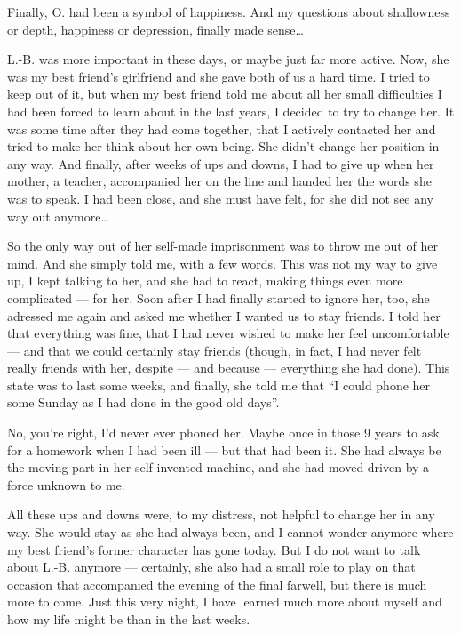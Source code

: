Finally, O. had been a symbol of happiness. And my questions about shallowness or depth, happiness or depression, finally made sense\ldots

L.-B. was more important in these days, or maybe just far more active. Now, she was my best friend's girlfriend and she gave both of us a hard time. I tried to keep out of it, but when my best friend told me about all her small difficulties I had been forced to learn about in the last years, I decided to try to change her. It was some time after they had come together, that I actively contacted her and tried to make her think about her own being. She didn't change her position in any way. And finally, after weeks of ups and downs, I had to give up when her mother, a teacher, accompanied her on the line and handed her the words she was to speak. I had been close, and she must have felt, for she did not see any way out anymore\ldots

So the only way out of her self-made imprisonment was to throw me out of her mind. And she simply told me, with a few words. This was not my way to give up, I kept talking to her, and she had to react, making things even more complicated --- for her. Soon after I had finally started to ignore her, too, she adressed me again and asked me whether I wanted us to stay friends. I told her that everything was fine, that I had never wished to make her feel uncomfortable --- and that we could certainly stay friends (though, in fact, I had never felt really friends with her, despite --- and because --- everything she had done). 
This state was to last some weeks, and finally, she told me that \enquote{I could phone her some Sunday as I had done in the good old days}.

No, you're right, I'd never ever phoned her. Maybe once in those 9 years to ask for a homework when I had been ill --- but that had been it. She had always be the moving part in her self-invented machine, and she had moved driven by a force unknown to me.

All these ups and downs were, to my distress, not helpful to change her in any way. She would stay as she had always been, and I cannot wonder anymore where my best friend's former character has gone today. 
But I do not want to talk about L.-B. anymore --- certainly, she also had a small role to play on that occasion that accompanied the evening of the final farwell, but there is much more to come. Just this very night, I have learned much more about myself and how my life might be than in the last weeks.


